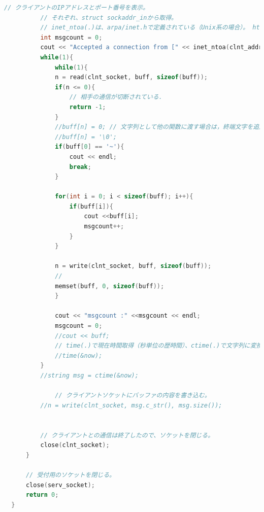 \documentclass[fleqn, a4paper. 12pt]{ltjsarticle}
\begin{document}
\begin{lstlisting}[language=C++]
          // クライアントのIPアドレスとポート番号を表示。
          // それぞれ、struct sockaddr_inから取得。
          // inet_ntoa(.)は、arpa/inet.hで定義されている（Unix系の場合）。 htons はエンディアンを変換する．
          int msgcount = 0;
          cout << "Accepted a connection from [" << inet_ntoa(clnt_addr.sin_addr) << "," << htons(clnt_addr.sin_port) << "]" << endl;
          while(1){
              while(1){
              n = read(clnt_socket, buff, sizeof(buff));
              if(n <= 0){
                  // 相手の通信が切断されている．
                  return -1;
              }
              //buff[n] = 0; // 文字列として他の関数に渡す場合は，終端文字を追加することを忘れないように気をつける．
              //buff[n] = '\0';
              if(buff[0] == '~'){
                  cout << endl;
                  break;
              }
              
              for(int i = 0; i < sizeof(buff); i++){
                  if(buff[i]){
                      cout <<buff[i];
                      msgcount++;
                  }
              }
  
              n = write(clnt_socket, buff, sizeof(buff));
              //
              memset(buff, 0, sizeof(buff));
              }
  
              cout << "msgcount :" <<msgcount << endl;
              msgcount = 0;
              //cout << buff;
              // time(.)で現在時間取得（秒単位の歴時間）、ctime(.)で文字列に変換し、送信バッファに書き込み。
              //time(&now);
          }
          //string msg = ctime(&now);
  
              // クライアントソケットにバッファの内容を書き込む。
          //n = write(clnt_socket, msg.c_str(), msg.size());
          
          
          // クライアントとの通信は終了したので、ソケットを閉じる。
          close(clnt_socket);
      }
  
      // 受付用のソケットを閉じる。
      close(serv_socket);
      return 0;
  }
  
\end{lstlisting}

    
\end{document}
